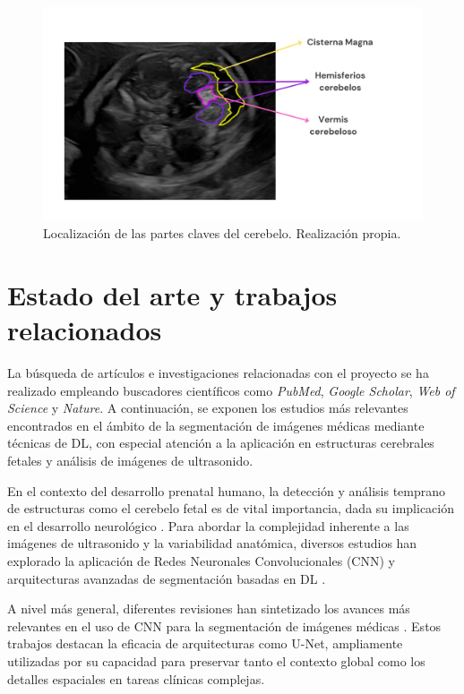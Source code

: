 \begin{figure}[h]
    \centering
    \includegraphics[width=\textwidth]{img/estructuras_interes.jpeg}
    \caption{Localización de las partes claves del cerebelo. Realización propia.}
    \label{fig: parte_anatomicas_cerebelo}
\end{figure}

\section{Estado del arte y trabajos relacionados}
La búsqueda de artículos e investigaciones relacionadas con el proyecto se ha realizado empleando buscadores científicos como \textit{PubMed}, \textit{Google Scholar}, \textit{Web of Science} y \textit{Nature}. A continuación, se exponen los estudios más relevantes encontrados en el ámbito de la segmentación de imágenes médicas mediante técnicas de DL, con especial atención a la aplicación en estructuras cerebrales fetales y análisis de imágenes de ultrasonido.

En el contexto del desarrollo prenatal humano, la detección y análisis temprano de estructuras como el cerebelo fetal es de vital importancia, dada su implicación en el desarrollo neurológico \cite{volpe2009, koning2017impacts}. Para abordar la complejidad inherente a las imágenes de ultrasonido y la variabilidad anatómica, diversos estudios han explorado la aplicación de Redes Neuronales Convolucionales (CNN) y arquitecturas avanzadas de segmentación basadas en DL \cite{hesamian2019}.

A nivel más general, diferentes revisiones han sintetizado los avances más relevantes en el uso de CNN para la segmentación de imágenes médicas \cite{hesamian2019, ajmal2018cnn}. Estos trabajos destacan la eficacia de arquitecturas como U-Net, ampliamente utilizadas por su capacidad para preservar tanto el contexto global como los detalles espaciales en tareas clínicas complejas.


